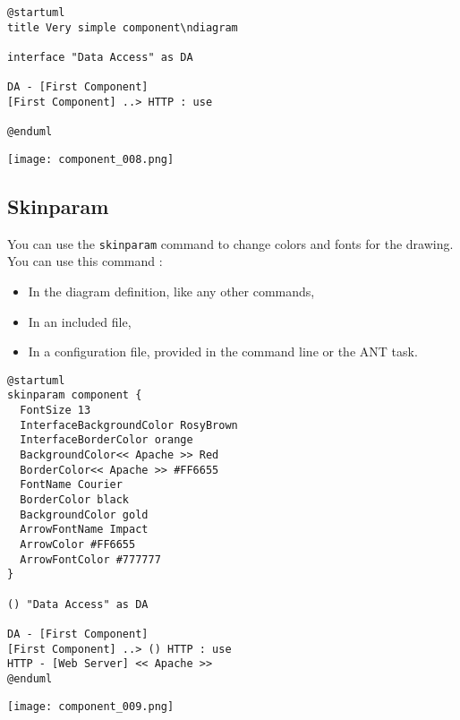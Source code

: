 \begin{lstlisting}
@startuml
title Very simple component\ndiagram

interface "Data Access" as DA

DA - [First Component] 
[First Component] ..> HTTP : use

@enduml
\end{lstlisting}

\begin{center}
\texttt{[image: component\_008.png]}
\end{center}


\newpage \subsection{Skinparam}

You can use the \texttt{skinparam} command to change colors and fonts for the
drawing. You can use this command :

\begin{itemize}
\item In the diagram definition, like any other commands,
\item In an included file,
\item In a configuration file, provided in the command line or the ANT task.
\end{itemize}

\begin{lstlisting}
@startuml
skinparam component {
  FontSize 13
  InterfaceBackgroundColor RosyBrown
  InterfaceBorderColor orange
  BackgroundColor<< Apache >> Red
  BorderColor<< Apache >> #FF6655
  FontName Courier
  BorderColor black
  BackgroundColor gold
  ArrowFontName Impact
  ArrowColor #FF6655
  ArrowFontColor #777777
}

() "Data Access" as DA

DA - [First Component] 
[First Component] ..> () HTTP : use
HTTP - [Web Server] << Apache >>
@enduml
\end{lstlisting}

\begin{center}
\texttt{[image: component\_009.png]}
\end{center}
				